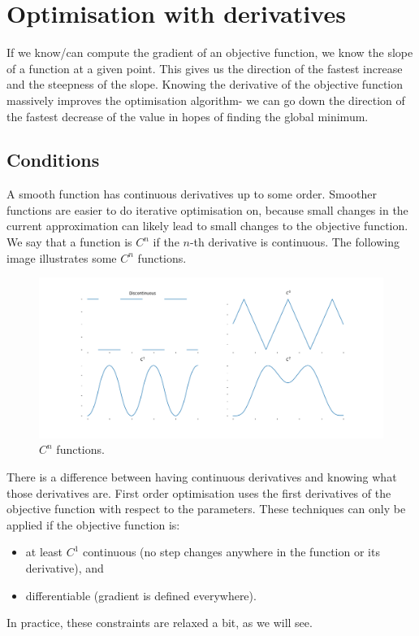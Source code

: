 \documentclass[a4paper, openany]{memoir}
\begin{document}
\section{Optimisation with derivatives}
If we know/can compute the gradient of an objective function, we know the slope of a function at a given point. This gives us the direction of the fastest increase and the steepness of the slope. Knowing the derivative of the objective function massively improves the optimisation algorithm- we can go down the direction of the fastest decrease of the value in hopes of finding the global minimum.

\subsection{Conditions}
A smooth function has continuous derivatives up to some order. Smoother functions are easier to do iterative optimisation on, because small changes in the current approximation can likely lead to small changes to the objective function. We say that a function is $C^n$ if the $n$-th derivative is continuous. The following image illustrates some $C^n$ functions.
\begin{figure}[H]
    \centering
    \includegraphics[scale=0.298]{src/4.24 Cn functions.png}
    \caption{$C^n$ functions.}
\end{figure}

There is a difference between having continuous derivatives and knowing what those derivatives are. First order optimisation uses the first derivatives of the objective function with respect to the parameters. These techniques can only be applied if the objective function is:
\begin{itemize}
    \item at least $C^1$ continuous (no step changes anywhere in the function or its derivative), and
    \item differentiable (gradient is defined everywhere).
\end{itemize}
In practice, these constraints are relaxed a bit, as we will see.
\end{document}
